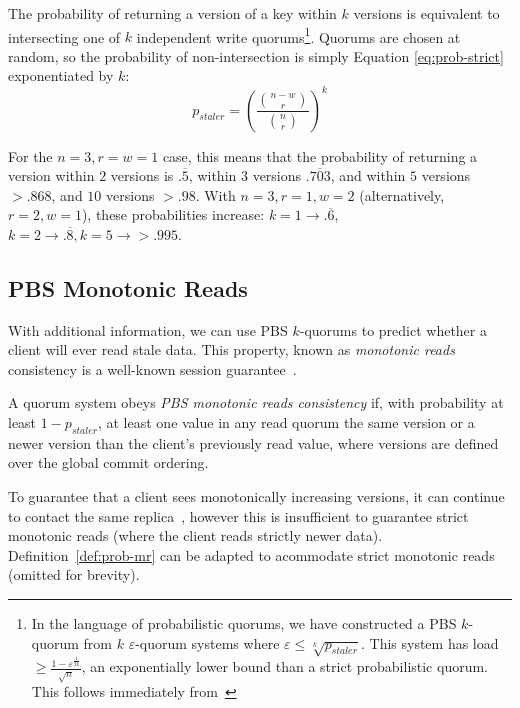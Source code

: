 \documentclass{vldb}
\begin{document}
The probability of returning a version of a key within $k$ versions is
equivalent to intersecting one of $k$ independent write
quorums\footnote{In the language of probabilistic quorums, we have
  constructed a PBS $k$-quorum from $k$ $\varepsilon$-quorum
  systems where $\varepsilon \leq \sqrt[k]{p_{staler}}$. This system
  has load $\geq \frac{1-\varepsilon^{\frac{1}{2k}}}{\sqrt{n}}$, an
  exponentially lower bound than a strict probabilistic quorum.  This
  follows immediately from~\cite[Corollary 3.12]{prob-quorum}}.
Quorums are chosen at random, so the probability of non-intersection
is simply Equation \ref{eq:prob-strict} exponentiated by $k$:
\begin{equation}
\label{eq:k-consistency}
p_{staler} = \left(\frac{{n-w \choose r}}{{n \choose r}}\right)^k
\end{equation}

For the $n=3, r=w=1$ case, this means that the probability of
returning a version within $2$ versions is $.\overline{5}$, within $3$
versions $.\overline{703}$, and within $5$ versions $> .868$, and $10$
versions $>.98$.  With $n=3, r=1, w=2$ (alternatively, $r=2, w=1$),
these probabilities increase: $k=1 \rightarrow
.\overline{6}$, $k=2 \rightarrow .\overline{8}, k=5 \rightarrow >
.995$.

\subsection{PBS Monotonic Reads}

With additional information, we can use PBS $k$-quorums to
predict whether a client will ever read stale data.  This property,
known as \textit{monotonic reads} consistency is a well-known session
guarantee~\cite{sessionguarantees}.

\begin{definition}
\label{def:prob-mr}
A quorum system obeys \textit{PBS monotonic reads consistency} if, with probability at least $1-p_{staler}$, at
least one value in any read quorum the same version or a newer version
than the client's previously read value, where versions are defined
over the global commit ordering.
\end{definition}

To guarantee that a client sees monotonically increasing versions, it
can continue to contact the same replica~\cite{vogels-defs}, however
this is insufficient to guarantee strict monotonic reads (where the
client reads strictly newer data).  Definition~\ref{def:prob-mr} can
be adapted to acommodate strict monotonic reads (omitted for brevity).
\end{document}
